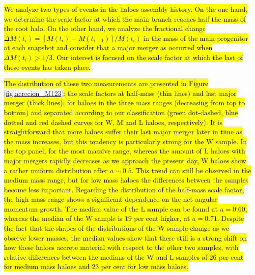 \documentclass[fleqn,usenatbib]{mnras}
\newcommand{\Wh}{\mathrm{W}}
\newcommand{\Lh}{\mathrm{L}}
\newcommand{\Mh}{\mathrm{M}}
\begin{document}
\hl{We analyze two types of events in the haloes assembly history. On the one hand, we determine the scale factor at which the main branch reaches half the mass of the root halo. On the other hand, we analyze the fractional change $\Delta M(t_i)=[M(t_i)-M(t_{i-1})]/M(t_i)$ in the mass of the main progenitor at each snapshot and consider that a major merger as occurred when $\Delta M(t_i)>1/3$. Our interest is focused on the scale factor at which the last of these events has taken place.}

\hl{The distribution of these two measurements are presented in Figure }\ref{fig:acrecion_M123}\hl{: the scale factors at half-mass (thin lines) and last major merger (thick lines), for haloes in the three mass ranges (decreasing from top to bottom) and separated according to our classification (green dot-dashed, blue dotted and red dashed curves for $\Wh$, $\Mh$ and $\Lh$ haloes, respectively). It is straightforward that more haloes suffer their last major merger later in time as the mass increases, but this tendency is particularly strong for the $\Wh$ sample. In the top panel, for the most massive range, whereas the amount of $\Lh$ haloes with major mergers rapidly decreases as we approach the present day, $\Wh$ haloes show a rather uniform distribution after $a\sim 0.5$. This trend can still be observed in the medium mass range, but for low mass haloes the differences between the samples become less important.
Regarding the distribution of the half-mass scale factor, the high mass range shows a significant dependence on the net angular momentum growth. The median value of the $\Lh$ sample can be found at $a=0.60$, whereas the median of the $\Wh$ sample is $19$ per cent higher, at $a=0.71$. Despite the fact that the shapes of the distributions of the $\Wh$ sample change as we observe lower masses, the median values show that there still is a strong shift on how these haloes accrete material with respect to the other two samples, with relative differences between the medians of the $\Wh$ and $\Lh$ samples of $26$ per cent for medium mass haloes and $23$ per cent for low mass haloes.}
\end{document}

